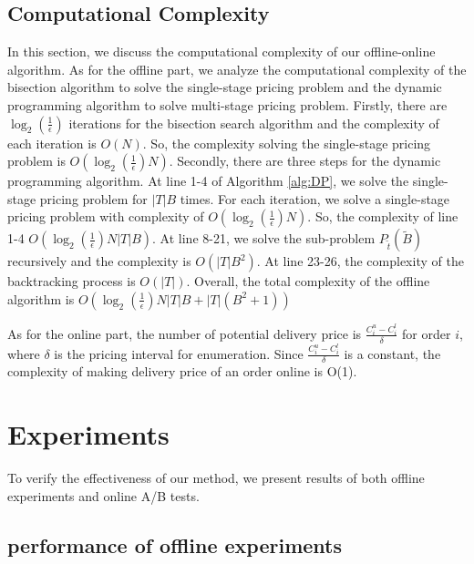 \documentclass[sigconf,authordraft]{acmart}
\begin{document}
\subsection{Computational Complexity}
In this section, we discuss the computational complexity of our offline-online algorithm. As for the offline part, we analyze the computational complexity of the bisection algorithm to solve the single-stage pricing problem and the dynamic programming algorithm to solve multi-stage pricing problem. Firstly, there are $\log_2(\frac{1}{\epsilon})$ iterations for the bisection search algorithm and the complexity of each iteration is $O(N)$. So, the complexity solving the single-stage pricing problem is $O(\log_2(\frac{1}{\epsilon})N)$. Secondly, there are three steps for the dynamic programming algorithm. At line 1-4 of Algorithm \ref{alg:DP}, we solve the single-stage pricing problem for $|T|B$ times. For each iteration, we solve a single-stage pricing problem with complexity of $O(\log_2(\frac{1}{\epsilon})N)$. So, the complexity of line 1-4 $O(\log_2(\frac{1}{\epsilon})N|T|B)$. At line 8-21, we solve the sub-problem $P_{\tilde{t}}(\tilde{B})$ recursively and the complexity is $O(|T|B^2)$. At line 23-26, the complexity of the backtracking process is $O(|T|)$. Overall, the total complexity of the offline algorithm is $O(\log_2(\frac{1}{\epsilon})N|T|B+|T|(B^2+1))$

As for the online part, the number of potential delivery price is $\frac{C^u_i-C^l_i}{\delta}$ for order $i$, where $\delta$ is the pricing interval for enumeration. Since $\frac{C^u_i-C^l_i}{\delta}$ is a constant, the complexity of making delivery price of an order online is O(1).

\section{Experiments}\label{sec:exp}

To verify the effectiveness of our method, we present results of both offline experiments and online A/B tests.

\subsection{performance of offline experiments}
\end{document}
